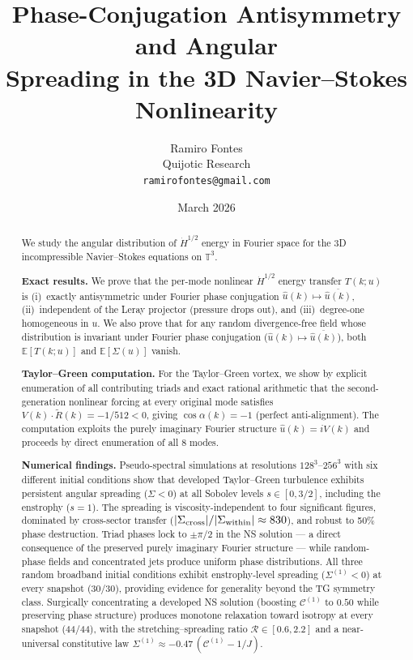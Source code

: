 \documentclass[11pt]{article}
\title{Phase-Conjugation Antisymmetry and Angular\\
Spreading in the 3D Navier--Stokes Nonlinearity}
\author{Ramiro Fontes\\
Quijotic Research\\
\texttt{ramirofontes@gmail.com}}
\date{March 2026}
\theoremstyle{definition}
\newcommand{\T}{\mathbb{T}}
\newcommand{\E}{\mathbb{E}}
\newcommand{\Hdot}[1]{\dot{H}^{#1}}
\newcommand{\cC}{\mathcal{C}}
\begin{document}
\maketitle

\begin{abstract}
We study the angular distribution of $\Hdot{1/2}$ energy
in Fourier space for the 3D incompressible Navier--Stokes
equations on $\T^3$.

\smallskip\noindent\textbf{Exact results.}
We prove that the per-mode nonlinear $\Hdot{1/2}$ energy
transfer $T(k;u)$ is (i)~exactly antisymmetric under
Fourier phase conjugation $\hat u(k)\mapsto\overline{\hat u(k)}$,
(ii)~independent of the Leray projector (pressure drops out),
and (iii)~degree-one homogeneous in $u$.
We also prove that for any random divergence-free
field whose distribution is invariant under
Fourier phase conjugation ($\hat u(k)\mapsto
\overline{\hat u(k)}$), both $\E[T(k;u)]$ and
$\E[\Sigma(u)]$ vanish.

\smallskip\noindent\textbf{Taylor--Green computation.}
For the Taylor--Green vortex, we show by explicit
enumeration of all contributing triads and exact rational
arithmetic that the second-generation nonlinear forcing
at every original mode satisfies
$V(k)\cdot\widetilde R(k)=-1/512<0$, giving
$\cos\alpha(k) = -1$ (perfect anti-alignment).  The
computation exploits the purely imaginary Fourier structure
$\hat u(k)=iV(k)$ and proceeds by direct enumeration of
all 8 modes.

\smallskip\noindent\textbf{Numerical findings.}
Pseudo-spectral simulations at resolutions $128^3$--$256^3$
with six different initial conditions show that developed
Taylor--Green turbulence exhibits persistent angular
spreading ($\Sigma < 0$) at all Sobolev levels
$s\in[0,3/2]$, including the enstrophy ($s=1$).
The spreading is viscosity-independent to four significant
figures, dominated by cross-sector transfer
($|\Sigma_{\rm cross}|/|\Sigma_{\rm within}|\approx 830$),
and robust to 50\% phase destruction.
Triad phases lock to $\pm\pi/2$ in the NS solution ---
a direct consequence of the preserved purely imaginary
Fourier structure --- while random-phase fields and
concentrated jets produce uniform phase distributions.
All three random broadband initial conditions exhibit
enstrophy-level spreading ($\Sigma^{(1)}<0$) at every
snapshot (30/30), providing evidence for generality
beyond the TG symmetry class.
Surgically concentrating a developed NS solution
(boosting $\cC^{(1)}$ to $0.50$ while preserving
phase structure) produces monotone relaxation toward
isotropy at every snapshot (44/44), with the
stretching--spreading ratio $\mathcal{R}\in[0.6,2.2]$
and a near-universal constitutive law
$\Sigma^{(1)}\approx -0.47\,(\cC^{(1)}-1/J)$.


\end{abstract}
\end{document}
